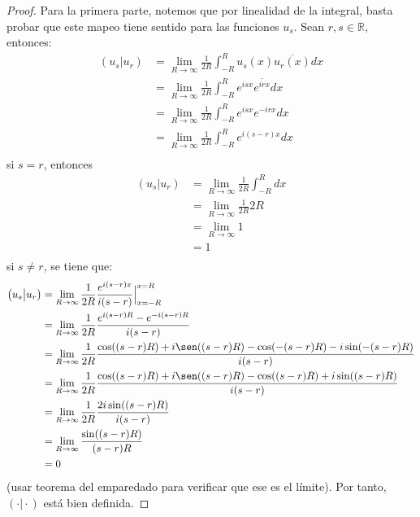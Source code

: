 \documentclass[12pt]{report}
\newcounter{it}
\theoremstyle{largebreak}
\newcommand\pint[2]{\ensuremath{\left(#1\big|#2\right)}}
\newcommand\conj[1]{\ensuremath{\overline{#1}}}
\begin{document}
    \begin{proof}
        Para la primera parte, notemos que por linealidad de la integral, basta probar que este mapeo tiene sentido para las funciones $u_s$. Sean $r,s\in\mathbb{R}$, entonces:
        \begin{equation*}
            \begin{split}
                \pint{u_s}{u_r}&=\lim_{R\rightarrow\infty}\frac{1}{2R}\int_{-R}^{R}u_s(x)\conj{u_r(x)}dx \\
                &=\lim_{R\rightarrow\infty}\frac{1}{2R}\int_{-R}^{R}e^{isx}\conj{e^{irx}}dx \\
                &=\lim_{R\rightarrow\infty}\frac{1}{2R}\int_{-R}^{R}e^{isx}e^{-irx}dx \\
                &=\lim_{R\rightarrow\infty}\frac{1}{2R}\int_{-R}^{R}e^{i(s-r)x}dx \\
            \end{split}
        \end{equation*}
        si $s=r$, entonces
        \begin{equation*}
            \begin{split}
                \pint{u_s}{u_r}&=\lim_{R\rightarrow\infty}\frac{1}{2R}\int_{-R}^{R}dx \\
                &=\lim_{R\rightarrow\infty}\frac{1}{2R}2R\\
                &=\lim_{R\rightarrow\infty}1\\
                &=1\\
            \end{split}
        \end{equation*}
        si $s\neq r$, se tiene que:
        \begin{equation*}
            \begin{split}
                \pint{u_s}{u_r}&=\lim_{R\rightarrow\infty}\frac{1}{2R}\frac{e^{i(s-r)x}}{i(s-r)}\Big|_{x=-R}^{x=R } \\
                &=\lim_{R\rightarrow\infty}\frac{1}{2R}\frac{e^{i(s-r)R}-e^{-i(s-r)R}}{i(s-r)}\\
                &=\lim_{R\rightarrow\infty}\frac{1}{2R}\frac{\cos((s-r)R)+i\sen((s-r)R)-\cos(-(s-r)R)-i\sin(-(s-r)R)}{i(s-r)}\\
                &=\lim_{R\rightarrow\infty}\frac{1}{2R}\frac{\cos((s-r)R)+i\sen((s-r)R)-\cos((s-r)R)+i\sin((s-r)R)}{i(s-r)}\\
                &=\lim_{R\rightarrow\infty}\frac{1}{2R}\frac{2i\sin((s-r)R)}{i(s-r)}\\
                &=\lim_{R\rightarrow\infty}\frac{\sin((s-r)R)}{(s-r)R}\\
                &=0\\
            \end{split}
        \end{equation*}
        (usar teorema del emparedado para verificar que ese es el límite). Por tanto, $\pint{\cdot}{\cdot}$ está bien definida.


\end{proof}
\end{document}
